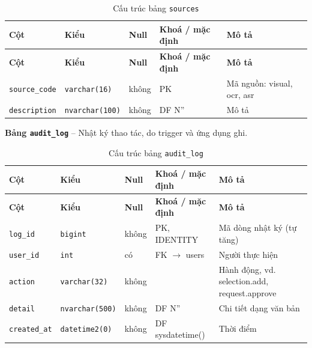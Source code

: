 \setlength{\tabcolsep}{4pt}
\begin{longtable}{>{\raggedright\arraybackslash}p{}>{\raggedright\arraybackslash}p{}>{\centering\arraybackslash}p{}>{\raggedright\arraybackslash}p{}>{\raggedright\arraybackslash}p{}}
\caption{Cấu trúc bảng \texttt{sources}}\label{tab:col_sources}\\
\toprule \textbf{Cột} & \textbf{Kiểu} & \textbf{Null} & \textbf{Khoá / mặc định} & \textbf{Mô tả} \\ \midrule \endfirsthead
\toprule \textbf{Cột} & \textbf{Kiểu} & \textbf{Null} & \textbf{Khoá / mặc định} & \textbf{Mô tả} \\ \midrule \endhead
\bottomrule \endfoot
\texttt{source\_code} & {\footnotesize\texttt{varchar(16)}} & không & PK & Mã nguồn: visual, ocr, asr \\
\texttt{description} & {\footnotesize\texttt{nvarchar(100)}} & không & DF N'' & Mô tả \\
\end{longtable}

\textbf{Bảng \texttt{audit\_log}} -- Nhật ký thao tác, do trigger và ứng dụng ghi.

\setlength{\tabcolsep}{4pt}
\begin{longtable}{>{\raggedright\arraybackslash}p{}>{\raggedright\arraybackslash}p{}>{\centering\arraybackslash}p{}>{\raggedright\arraybackslash}p{}>{\raggedright\arraybackslash}p{}}
\caption{Cấu trúc bảng \texttt{audit\_log}}\label{tab:col_audit_log}\\
\toprule \textbf{Cột} & \textbf{Kiểu} & \textbf{Null} & \textbf{Khoá / mặc định} & \textbf{Mô tả} \\ \midrule \endfirsthead
\toprule \textbf{Cột} & \textbf{Kiểu} & \textbf{Null} & \textbf{Khoá / mặc định} & \textbf{Mô tả} \\ \midrule \endhead
\bottomrule \endfoot
\texttt{log\_id} & {\footnotesize\texttt{bigint}} & không & PK, IDENTITY & Mã dòng nhật ký (tự tăng) \\
\texttt{user\_id} & {\footnotesize\texttt{int}} & có & FK $\rightarrow$ users & Người thực hiện \\
\texttt{action} & {\footnotesize\texttt{varchar(32)}} & không &  & Hành động, vd. selection.add, request.approve \\
\texttt{detail} & {\footnotesize\texttt{nvarchar(500)}} & không & DF N'' & Chi tiết dạng văn bản \\
\texttt{created\_at} & {\footnotesize\texttt{datetime2(0)}} & không & DF sysdatetime() & Thời điểm \\
\end{longtable}

